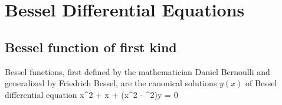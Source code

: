 





\section{Bessel Differential Equations}


\subsection{Bessel function of first kind}

Bessel functions, first defined by the mathematician Daniel Bernoulli and generalized by Friedrich Bessel, are the canonical solutions $y(x)$ of Bessel differential equation
\be
x^2  + x  + (x^2 - \nu^2)y = 0
\ee




